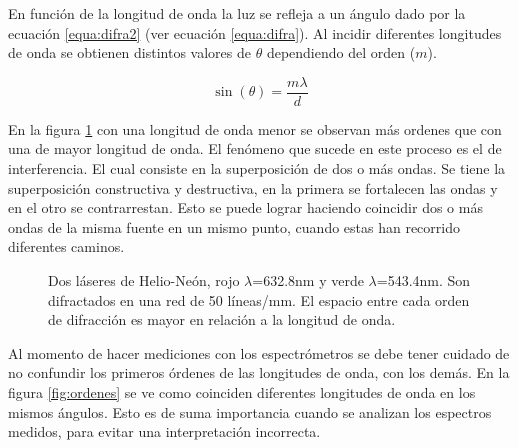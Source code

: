 En función de la longitud de onda la luz se refleja a un ángulo dado por la ecuación \ref{equa:difra2} (ver ecuación \ref{equa:difra}). Al incidir diferentes longitudes de onda se obtienen distintos valores de $\theta$ dependiendo del orden ($m$). 

\begin{equation}
\sin(\theta) = \frac{m \lambda}{d}
\label{equa:difra2}
\end{equation}

En la figura \ref{fig:difracro} con una longitud de onda menor se observan más ordenes que con una de mayor longitud de onda. 
El fenómeno que sucede en este proceso es el de interferencia. El cual consiste en la superposición de dos o más ondas. Se tiene la superposición constructiva y destructiva, en la primera se fortalecen las ondas y en el otro se contrarrestan. Esto se puede lograr haciendo coincidir dos o más ondas de la misma fuente en un mismo punto, cuando estas han recorrido diferentes caminos.


\begin{figure}
	\centering
	\caption[Difracción de la luz con diferentes longitudes de onda.]{Dos láseres de Helio-Neón, rojo $\lambda$=632.8nm y verde $\lambda$=543.4nm. Son difractados en una red de 50 líneas/mm. El espacio entre cada orden de difracción es mayor en relación a la longitud de onda. \cite{laserGR}}
	\label{fig:difracro}
\end{figure}
Al momento de hacer mediciones con los espectrómetros se debe tener cuidado de no confundir los primeros órdenes de las longitudes de onda, con los demás. En la figura \ref{fig:ordenes} se ve como coinciden diferentes longitudes de onda en los mismos ángulos. Esto es de suma importancia cuando se analizan los espectros medidos, para evitar una interpretación incorrecta.


